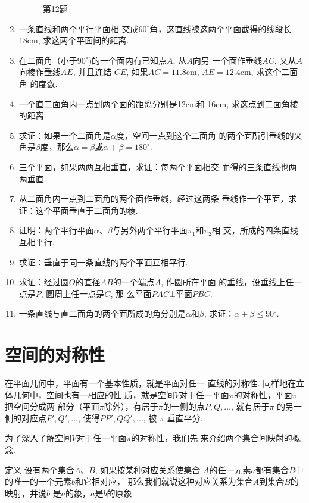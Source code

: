 \begin{enumerate}
\begin{figure}[htp]
\begin{tikzpicture}
\end{tikzpicture}
  \caption*{第12题}
\end{figure}

\item 一条直线和两个平行平面相
交成$60^{\circ}$角，这直线被这两个平面截得的线段长18cm, 
求这两个平面间的距离. 
\item 在二面角（小于$90^{\circ}$)的一个面内有已知点$A$, 从$A$向另
一个面作垂线$AC$, 又从$A$向棱作垂线$AE$, 并且连结
$CE$, 如果$AC=11.8$cm, $AE=12.4$cm, 求这个二面角
的度数. 
\item 一个直二面角内一点到两个面的距离分别是12cm和
16cm, 求这点到二面角棱的距离. 
\item 求证：如果一个二面角是$\alpha$度，空间一点到这个二面角
的两个面所引垂线的夹角是$\beta$度，那么$\alpha=\beta$或$\alpha+\beta=180^{\circ}$.
\item 三个平面，如果两两互相垂直，求证：每两个平面相交
而得的三条直线也两两垂直. 
\item 从二面角内一点到二面角的两个面作垂线，经过这两条
垂线作一个平面，求证：这个平面垂直于二面角的棱. 
\item 证明：两个平行平面$\alpha$、$\beta$与另外两个平行平面$\pi_1$和$\pi_2$相
交，所成的四条直线互相平行. 
\item 求证：垂直于同一条直线的两个平面互相平行. 
\item 求证：经过圆$O$的直径$AB$的一个端点$A$, 作圆所在平面
的垂线，设垂线上任一点是$P$, 圆周上任一点是$C$, 那
么平面$PAC\bot $平面$PBC$.
\item 一条直线与直二面角的两个面所成的角分别是$\alpha$和$\beta$, 
求证：$\alpha+\beta\le 90^{\circ}$.
\end{enumerate}

\section{空间的对称性}
在平面几何中，平面有一个基本性质，就是平面对任一
直线的对称性. 同样地在立体几何中，空间也有一相应的性
质，就是空间$V$对于任一平面$\pi$的对称性，平面$\pi$把空间分成两
部分（平面$\pi$除外），有居于$\pi$的一侧的点$P,Q,\ldots$, 就有居于$\pi$
的另一侧的对应点$P',Q',\ldots$, 使得$PP',QQ',\ldots$, 被
$\pi$
垂直平分. 

为了深入了解空间$V$对于任一平面$\pi$的对称性，我们先
来介绍两个集合间映射的概念. 

\begin{blk}
 {定义} 设有两个集合$A$、$B$, 如果按某种对应关系使集合
$A$的任一元素$a$都有集合$B$中的唯一的一个元素$b$和它相对应，
那么我们就说这种对应关系为集合$A$到集合$B$的映射，并说$b$
是$a$的象，$a$是$b$的原象.  
\end{blk}

